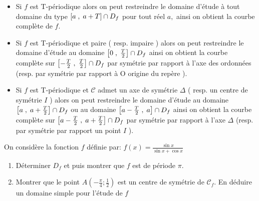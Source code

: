 \begin{example}
\begin{itemize}
\item[\textbullet] Si $ f $ est T-périodique alors on peut restreindre le domaine d'étude à tout domaine du type $ \left[a\;,\; a+T\right]\cap D_{f} $ pour tout réel $ a, $ ainsi on obtient la courbe complète de $ f. $
\item[\textbullet] Si $ f $ est T-périodique   et paire ( resp. impaire ) alors on peut restreindre le domaine d'étude au domaine  $ \left[0\;,\; \frac{T}{2}\right]\cap D_{f} $  ainsi on obtient la courbe complète sur $ \left[-\frac{T}{2}\;,\; \frac{T}{2}\right]\cap D_{f} $ par symétrie par rapport à l'axe des ordonnées (resp. par symétrie par rapport à O origine du repère ).
\item[\textbullet] Si $ f $ est T-périodique   et $ \mathcal{C} $  admet un axe de symétrie $ \Delta $ ( resp. un centre de symétrie $ I $ ) alors on peut restreindre le domaine d'étude au domaine \\ $ \left[a\;,\; a+\frac{T}{2}\right]\cap D_{f} $ ou au domaine  $ \left[a-\frac{T}{2}\;,\; a\right]\cap D_{f} $ ainsi on obtient la courbe complète sur $ \left[a-\frac{T}{2}\;,\; a+\frac{T}{2}\right]\cap D_{f} $ par symétrie par rapport à l'axe $ \Delta $  (resp. par symétrie par rapport un point $ I $ ).
\end{itemize}

 \begin{exercice}
On considère  la fonction $ f $ définie par: $ f(x)= \frac{\sin x }{\sin x+\cos x} $ 
\begin{enumerate}
\item Déterminer $ D_{f} $ et  puis montrer que  $ f$ est de période  $ \pi. $
\item Montrer que le point  $ A(-\frac{\pi}{4}; \frac{1}{2}) $ est un centre de symétrie de $ \mathcal{C}_{f} $. En déduire un domaine simple pour l'étude de $ f $ 
\end{enumerate}
 \end{exercice}


\end{example}
